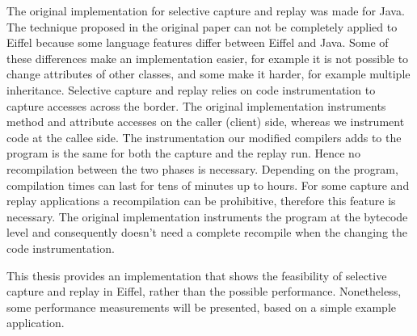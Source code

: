 The original implementation for selective capture and replay was made for Java. The technique proposed in the original paper can not be completely applied to Eiffel because some language features differ between Eiffel and Java. Some of these differences make an implementation easier, for example it is not possible to change attributes of other classes, and some make it harder, for example multiple inheritance. Selective capture and replay relies on code instrumentation to capture accesses across the border. The original implementation instruments method and attribute accesses on the caller (client) side, whereas we instrument code at the callee side. The instrumentation our modified compilers adds to the program is the same for both the capture and the replay run. Hence no recompilation between the two phases is necessary. Depending on the program, compilation times can last for tens of minutes up to hours. For some capture and replay applications a recompilation can be prohibitive, therefore this feature is necessary. The original implementation instruments the program at the bytecode level and consequently doesn't need a complete recompile when the changing the code instrumentation.

  This thesis provides an implementation that shows the feasibility of selective capture and replay in Eiffel, rather than the possible performance. Nonetheless, some performance measurements will be presented, based on a simple example application.


